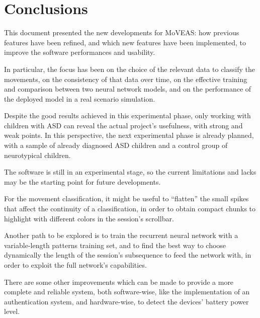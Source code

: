 \chapter{Conclusions}
This document presented the new developments for MoVEAS: how previous features have been refined, and which new features have been implemented, to improve the software performances and usability.

In particular, the focus has been on the choice of the relevant data to classify the movements, on the consistency of that data over time, on the effective training and comparison between two neural network models, and on the performance of the deployed model in a real scenario simulation.
\bigbreak

Despite the good results achieved in this experimental phase, only working with children with ASD can reveal the actual project's usefulness, with strong and weak points. In this perspective, the next experimental phase is already planned, with a sample of already diagnosed ASD children and a control group of neurotypical children.
\bigbreak

The software is still in an experimental stage, so the current limitations and lacks may be the starting point for future developments.

For the movement classification, it might be useful to ``flatten'' the small spikes that affect the continuity of a classification, in order to obtain compact chunks to highlight with different colors in the session's scrollbar.

Another path to be explored is to train the recurrent neural network with a variable-length patterns training set, and to find the best way to choose dynamically the length of the session's subsequence to feed the network with, in order to exploit the full network's capabilities.

There are some other improvements which can be made to provide a more complete and reliable system, both software-wise, like the implementation of an authentication system, and hardware-wise, to detect the devices' battery power level.

